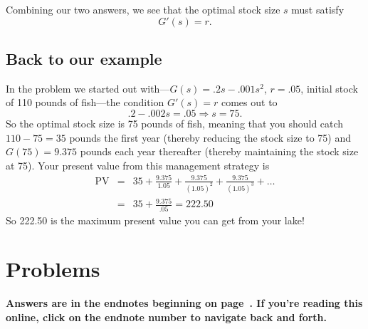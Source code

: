 Combining our two answers, we see that the optimal stock size $s$ must satisfy
\[
G'(s)=r.
\]

\subsection*{Back to our example}

In the problem we started out with---$G(s)=.2s-.001s^2$, $r=.05$, initial stock of 110 pounds of fish---the condition $G'(s)=r$ comes out to
\[
.2-.002s = .05 \Longrightarrow s=75.
\]
So the optimal stock size is 75 pounds of fish, meaning that you should catch $110-75=35$ pounds the first year (thereby reducing the stock size to 75) and $G(75)=9.375$ pounds each year thereafter (thereby maintaining the stock size at 75). Your present value from this management strategy is
\begin{eqnarray*}
\mbox{PV} & = & 35 + \frac{9.375}{1.05}+\frac{9.375}{(1.05)^2}+\frac{9.375}{(1.05)^3}+\ldots \\
& = & 35 + \frac{9.375}{.05} =222.50%
\end{eqnarray*}
So 222.50 is the maximum present value you can get from your lake!





\bigskip
\bigskip
\section*{Problems\label{1treesfishq}}

\noindent \textbf{Answers are in the endnotes beginning on page~\pageref{1treesfisha}. If you're reading this online, click on the endnote number to navigate back and forth.}

